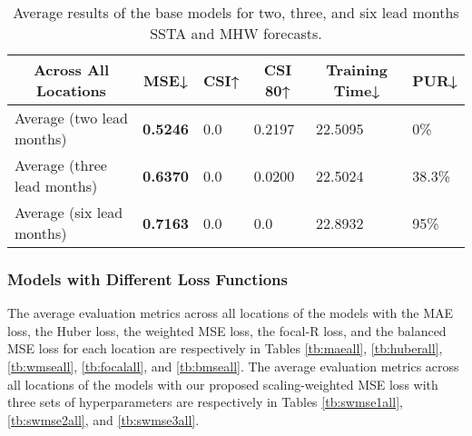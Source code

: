 \documentclass[11pt, a4paper]{article}
\begin{document}
\begin{table}[H]
\centering
\scriptsize
\caption{Average results of the base models for two, three, and six lead months SSTA and MHW forecasts.}\label{tb:vanillaall}
\begin{tabular}{llllll}
\multicolumn{1}{c}{\textbf{Across All Locations}} & \multicolumn{1}{c}{\textbf{MSE↓}} & \multicolumn{1}{c}{\textbf{CSI↑}} & \multicolumn{1}{c}{\textbf{CSI 80↑}} & \multicolumn{1}{c}{\textbf{Training Time↓}} & \multicolumn{1}{c}{\textbf{PUR↓}} \\ \hline
Average (two lead months)                         & \textbf{0.5246}                   & 0.0                               & 0.2197                               & 22.5095                                     & 0\%                               \\
Average (three lead months)                       & \textbf{0.6370}                   & 0.0                               & 0.0200                               & 22.5024                                     & 38.3\%                            \\
Average (six lead months)                         & \textbf{0.7163}                   & 0.0                               & 0.0                                  & 22.8932                                     & 95\%
\end{tabular}
\end{table}

\subsubsection{Models with Different Loss Functions}

The average evaluation metrics across all locations of the models with the MAE loss, the Huber loss, the weighted MSE loss, the focal-R loss, and the balanced MSE loss for each location are respectively in Tables \ref{tb:maeall}, \ref{tb:huberall}, \ref{tb:wmseall}, \ref{tb:focalall}, and \ref{tb:bmseall}. The average evaluation metrics across all locations of the models with our proposed scaling-weighted MSE loss with three sets of hyperparameters are respectively in Tables \ref{tb:swmse1all}, \ref{tb:swmse2all}, and \ref{tb:swmse3all}.
\end{document}
